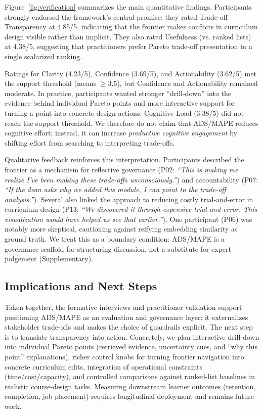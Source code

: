 \documentclass[sigconf,review]{acmart}
\newcommand{\ADS}{\textsc{ADS}\xspace}
\newcommand{\MAPE}{\textsc{MAPE}\xspace}
\begin{document}


Figure~\ref{fig:verification} summarizes the main quantitative findings. Participants strongly endorsed the framework's central promise: they rated {Trade-off Transparency} at {4.85/5}, indicating that the frontier makes conflicts in curriculum design visible rather than implicit. They also rated {Usefulness (vs. ranked lists)} at {4.38/5}, suggesting that practitioners prefer Pareto trade-off presentation to a single scalarized ranking.

Ratings for {Clarity} (4.23/5), {Confidence} (3.69/5), and {Actionability} (3.62/5) met the support threshold (means $\ge 3.5$), but Confidence and Actionability remained moderate. In practice, participants wanted stronger ``drill-down'' into the evidence behind individual Pareto points and more interactive support for turning a point into concrete design actions. {Cognitive Load} (3.38/5) did not reach the support threshold. We therefore do not claim that \ADS/\MAPE reduces cognitive effort; instead, it can increase \emph{productive cognitive engagement} by shifting effort from searching to interpreting trade-offs.

Qualitative feedback reinforces this interpretation. Participants described the frontier as a mechanism for reflective governance (P02: \textit{``This is making me realize I've been making these trade-offs unconsciously.''}) and accountability (P07: \textit{``If the dean asks why we added this module, I can point to the trade-off analysis.''}). Several also linked the approach to reducing costly trial-and-error in curriculum design (P13: \textit{``We discovered it through expensive trial and error. This visualization would have helped us see that earlier.''}). One participant (P06) was notably more skeptical, cautioning against reifying embedding similarity as ground truth. We treat this as a boundary condition: \ADS/\MAPE is a governance scaffold for structuring discussion, not a substitute for expert judgement (Supplementary).

\subsection{Implications and Next Steps}
Taken together, the formative interviews and practitioner validation support positioning \ADS/\MAPE as an evaluation and governance layer: it externalizes stakeholder trade-offs and makes the choice of guardrails explicit. The next step is to translate transparency into action. Concretely, we plan interactive drill-down into individual Pareto points (retrieved evidence, uncertainty cues, and ``why this point'' explanations), richer control knobs for turning frontier navigation into concrete curriculum edits, integration of operational constraints (time/cost/capacity), and controlled comparisons against ranked-list baselines in realistic course-design tasks. Measuring downstream learner outcomes (retention, completion, job placement) requires longitudinal deployment and remains future work.
\end{document}
